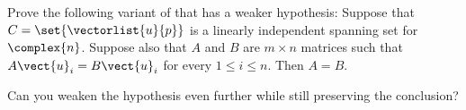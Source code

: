 Prove the following variant of  that has a weaker hypothesis:  Suppose that $C=\set{\vectorlist{u}{p}}$ is a linearly independent spanning set for $\complex{n}$.  Suppose also that $A$ and $B$ are $m\times n$ matrices such that $A\vect{u}_i=B\vect{u}_i$ for every $1\leq i\leq n$.  Then $A=B$.\par
%
Can you weaken the hypothesis even further while still preserving the conclusion?